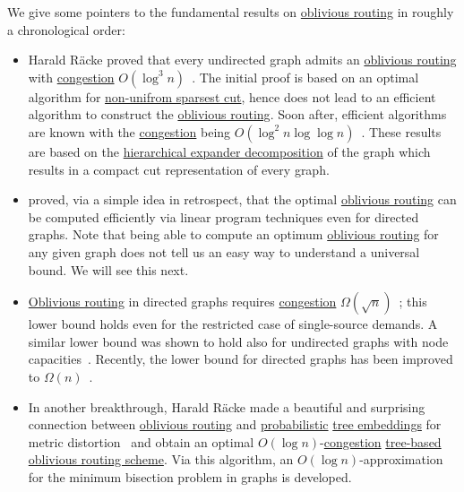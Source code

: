 We give some pointers to the fundamental results on \hyperref[prb:oblivious-routing]{oblivious routing} in roughly a chronological order:
\begin{itemize}
	\item Harald Räcke proved that every undirected graph admits an \hyperref[def:oblivious-routing-scheme]{oblivious routing} with \hyperref[def:congestion-of-oblivious-routing]{congestion} \(O(\log ^3 n)\)~\cite{racke2002minimizing}. The initial proof is based on an optimal algorithm for \hyperref[prb:non-uniform-sparsest-cut]{non-unifrom sparsest cut}, hence does not lead to an efficient algorithm to construct the \hyperref[def:oblivious-routing-scheme]{oblivious routing}. Soon after, efficient algorithms are known with the \hyperref[def:congestion-of-oblivious-routing]{congestion} being \(O(\log ^2 n \log \log n)\)~\cite{bienkowski2003practical,harrelson2003polynomial}. These results are based on the \hyperref[thm:hierarchical-expander-decomposition]{hierarchical expander decomposition} of the graph which results in a compact cut representation of every graph.
	\item \cite{azar2003optimal} proved, via a simple idea in retrospect, that the optimal \hyperref[def:oblivious-routing-scheme]{oblivious routing} can be computed efficiently via linear program techniques even for directed graphs. Note that being able to compute an optimum \hyperref[def:oblivious-routing-scheme]{oblivious routing} for any given graph does not tell us an easy way to understand a universal bound. We will see this next.
	\item \hyperref[def:oblivious-routing-scheme]{Oblivious routing} in directed graphs requires \hyperref[def:congestion-of-oblivious-routing]{congestion} \(\Omega (\sqrt{n} )\)~\cite{azar2003optimal}; this lower bound holds even for the restricted case of single-source demands. A similar lower bound was shown to hold also for undirected graphs with node capacities~\cite{hajiaghayi2007oblivious}. Recently, the lower bound for directed graphs has been improved to \(\Omega (n)\)~\cite{ene2016routing}.
	\item In another breakthrough, Harald Räcke made a beautiful and surprising connection between \hyperref[def:oblivious-routing-scheme]{oblivious routing} and \hyperref[def:probabilistic-approximation]{probabilistic} \hyperref[prb:tree-embedding]{tree embeddings} for metric distortion~\cite{racke2008optimal} and obtain an optimal \(O(\log n)\)-\hyperref[def:congestion-of-oblivious-routing]{congestion} \hyperref[not:tree-based-oblivious-routing]{tree-based oblivious routing scheme}. Via this algorithm, an \(O(\log n)\)-approximation for the minimum bisection problem in graphs is developed.
\end{itemize}


